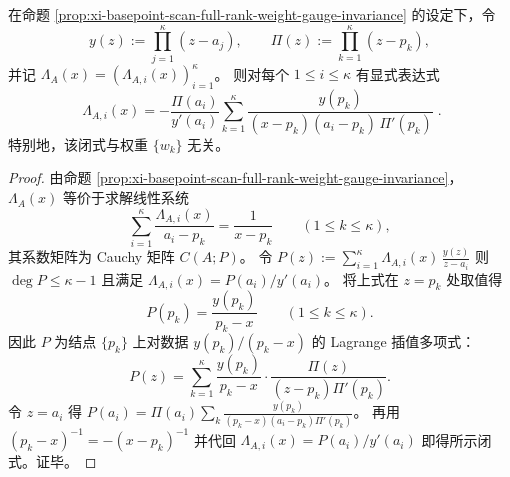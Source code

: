 \begin{proposition}\label{prop:xi-basepoint-scan-lambda-cauchy-lagrange-closed-form}
在命题 \ref{prop:xi-basepoint-scan-full-rank-weight-gauge-invariance} 的设定下，令
\[
y(z):=\prod_{j=1}^{\kappa}(z-a_j),\qquad \Pi(z):=\prod_{k=1}^{\kappa}(z-p_k),
\]
并记 \(\Lambda_A(x)=(\Lambda_{A,i}(x))_{i=1}^{\kappa}\)。
则对每个 \(1\le i\le \kappa\) 有显式表达式
\[
\boxed{\;
\Lambda_{A,i}(x)
=
-\frac{\Pi(a_i)}{y'(a_i)}
\sum_{k=1}^{\kappa}
\frac{y(p_k)}{(x-p_k)(a_i-p_k)\,\Pi'(p_k)}\; }.
\]
特别地，该闭式与权重 \(\{w_k\}\) 无关。
\end{proposition}
\begin{proof}
由命题 \ref{prop:xi-basepoint-scan-full-rank-weight-gauge-invariance}，\(\Lambda_A(x)\) 等价于求解线性系统
\[
\sum_{i=1}^{\kappa}\frac{\Lambda_{A,i}(x)}{a_i-p_k}=\frac{1}{x-p_k}\qquad(1\le k\le \kappa),
\]
其系数矩阵为 Cauchy 矩阵 \(C(A;P)\)。
令
\(
P(z):=\sum_{i=1}^{\kappa}\Lambda_{A,i}(x)\,\frac{y(z)}{z-a_i}
\)
则 \(\deg P\le \kappa-1\) 且满足 \(\Lambda_{A,i}(x)=P(a_i)/y'(a_i)\)。
将上式在 \(z=p_k\) 处取值得
\[
P(p_k)=\frac{y(p_k)}{p_k-x}\qquad(1\le k\le \kappa).
\]
因此 \(P\) 为结点 \(\{p_k\}\) 上对数据 \(y(p_k)/(p_k-x)\) 的 Lagrange 插值多项式：
\[
P(z)=\sum_{k=1}^{\kappa}\frac{y(p_k)}{p_k-x}\cdot \frac{\Pi(z)}{(z-p_k)\Pi'(p_k)}.
\]
令 \(z=a_i\) 得
\(
P(a_i)=\Pi(a_i)\sum_{k}\frac{y(p_k)}{(p_k-x)(a_i-p_k)\Pi'(p_k)}
\)。
再用 \((p_k-x)^{-1}=-(x-p_k)^{-1}\) 并代回 \(\Lambda_{A,i}(x)=P(a_i)/y'(a_i)\) 即得所示闭式。证毕。
\end{proof}

\endinput

